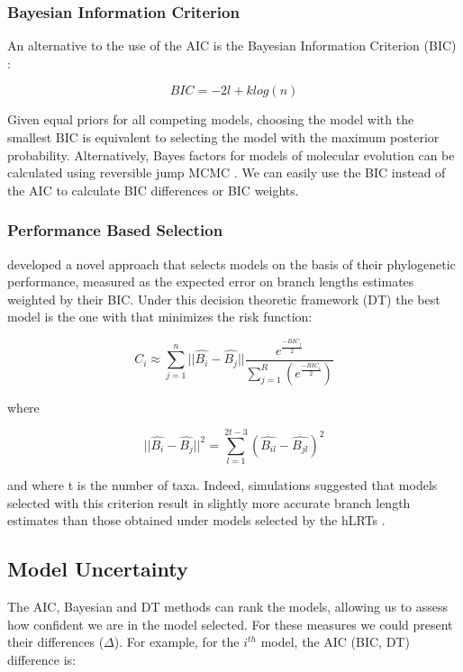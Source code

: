 \subsubsection{Bayesian Information Criterion}
\label{sec:bic}

An alternative to the use of the AIC is the Bayesian Information Criterion (BIC) \citep{Schwarz-1978}:

\[
BIC=-2l + k log(n)
\]

Given equal priors for all competing models, choosing the model with the smallest BIC is equivalent to selecting the model with the maximum posterior probability. Alternatively, Bayes factors for models of molecular evolution can be calculated using reversible jump MCMC \citep{Huelsenbeck-2004}. We can easily use the BIC instead of the AIC to calculate BIC differences or BIC weights.

\subsubsection{Performance Based Selection}
\label{sec:dt}

\citet{Minin-2003} developed a novel approach that selects models on the basis of their phylogenetic performance, measured as the expected error on branch lengths estimates weighted by their BIC. Under this decision theoretic framework (DT) the best model is the one with that minimizes the risk function:

\[
C_i \approx \sum_{j=1}^n||\hat{B_i} - \hat{B_j}||\frac{e^{\frac{-BIC_j}{2}}}{\sum_{j=1}^R(e^\frac{-BIC_i}{2})}
\]

where 

\[
||\hat{B_i} - \hat{B_j}||^2 = \sum_{l=1}^{2t-3}(\hat{B_{il}} - \hat{B_{jl}})^2
\]

and where t is the number of taxa. Indeed, simulations suggested that models selected with this criterion result in slightly more accurate branch length estimates than those obtained under models selected by the hLRTs \citep{Minin-2003, Abdo-2005}.

\subsection{Model Uncertainty}

The AIC, Bayesian and DT methods can rank the models, allowing us to assess how confident we are in the model selected. For these measures we could present their differences ($\Delta$). For example, for the $i^{th}$ model, the AIC (BIC, DT) difference is:

